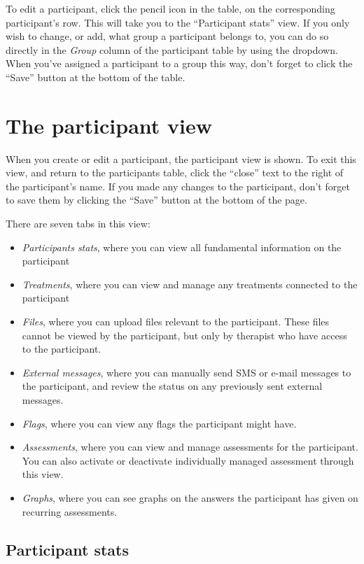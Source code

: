 \documentclass[]{book}
\providecommand{\tightlist}{%
  \setlength{\itemsep}{0pt}\setlength{\parskip}{0pt}}
\begin{document}
To edit a participant, click the pencil icon in the table, on the corresponding participant's row. This will take you to the ``Participant stats'' view.
If you only wish to change, or add, what group a participant belongs to, you can do so directly in the \emph{Group} column of the participant table by using the dropdown. When you've assigned a participant to a group this way, don't forget to click the ``Save'' button at the bottom of the table.

\hypertarget{the-participant-view}{%
\section{The participant view}\label{the-participant-view}}

When you create or edit a participant, the participant view is shown. To exit this view, and return to the participants table, click the ``close'' text to the right of the participant's name. If you made any changes to the participant, don't forget to save them by clicking the ``Save'' button at the bottom of the page.

There are seven tabs in this view:

\begin{itemize}
\tightlist
\item
  \emph{Participants stats}, where you can view all fundamental information on the participant
\item
  \emph{Treatments}, where you can view and manage any treatments connected to the participant
\item
  \emph{Files}, where you can upload files relevant to the participant. These files cannot be viewed by the participant, but only by therapist who have access to the participant.
\item
  \emph{External messages}, where you can manually send SMS or e-mail messages to the participant, and review the status on any previously sent external messages.
\item
  \emph{Flags}, where you can view any flags the participant might have.
\item
  \emph{Assessments}, where you can view and manage assessments for the participant. You can also activate or deactivate individually managed assessment through this view.
\item
  \emph{Graphs}, where you can see graphs on the answers the participant has given on recurring assessments.
\end{itemize}

\hypertarget{participant-stats}{%
\subsection{Participant stats}\label{participant-stats}}
\end{document}
